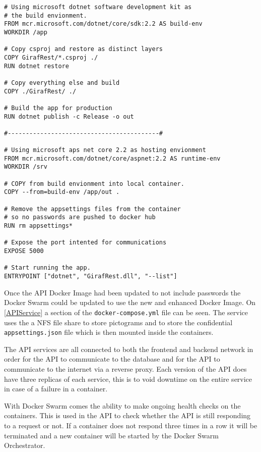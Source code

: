 \begin{lstlisting}[caption={API Dockerfile},captionpos=b,label=APIDockerfile,escapechar=\%]
# Using microsoft dotnet software development kit as 
# the build envionment.
FROM mcr.microsoft.com/dotnet/core/sdk:2.2 AS build-env
WORKDIR /app

# Copy csproj and restore as distinct layers
COPY GirafRest/*.csproj ./
RUN dotnet restore

# Copy everything else and build
COPY ./GirafRest/ ./

# Build the app for production
RUN dotnet publish -c Release -o out

#------------------------------------------#

# Using microsoft aps net core 2.2 as hosting envionment
FROM mcr.microsoft.com/dotnet/core/aspnet:2.2 AS runtime-env
WORKDIR /srv

# COPY from build envionment into local container.
COPY --from=build-env /app/out .

# Remove the appsettings files from the container 
# so no passwords are pushed to docker hub
RUN rm appsettings*

# Expose the port intented for communications
EXPOSE 5000

# Start running the app.
ENTRYPOINT ["dotnet", "GirafRest.dll", "--list"]
\end{lstlisting}

Once the API Docker Image had been updated to not include passwords the Docker Swarm could be updated to use the new and enhanced Docker Image. 
On \autoref{APIService} a section of the \lstinline$docker-compose.yml$ file can be seen.
The service uses the a NFS file share to store pictograms and to store the confidential \lstinline$appsettings.json$ file which is then mounted inside the containers.

The API services are all connected to both the frontend and backend network in order for the API to communicate to the database and for the API to communicate to the internet via a reverse proxy. 
Each version of the API does have three replicas of each service, this is to void downtime on the entire service in case of a failure in a container.

With Docker Swarm comes the ability to make ongoing health checks on the containers. 
This is used in the API to check whether the API is still responding to a request or not.
If a container does not respond three times in a row it will be terminated and a new container will be started by the Docker Swarm Orchestrator.

